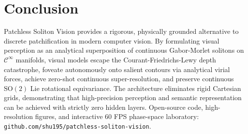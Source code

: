 \documentclass[10pt,twocolumn]{article}
\begin{document}
\section{Conclusion}
Patchless Soliton Vision provides a rigorous, physically grounded alternative to discrete patchification in modern computer vision. By formulating visual perception as an analytical superposition of continuous Gabor-Morlet solitons on $\mathcal{C}^\infty$ manifolds, visual models escape the Courant-Friedrichs-Lewy depth catastrophe, foveate autonomously onto salient contours via analytical virial forces, achieve zero-shot continuous super-resolution, and preserve continuous $\mathrm{SO}(2)$ Lie rotational equivariance. The architecture eliminates rigid Cartesian grids, demonstrating that high-precision perception and semantic representation can be achieved with strictly zero hidden layers. Open-source code, high-resolution figures, and interactive 60 FPS phase-space laboratory: {\small\texttt{github.com/shu195/patchless-soliton-vision}}.
\end{document}
